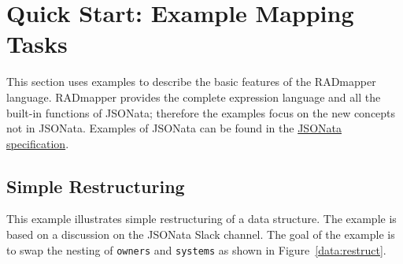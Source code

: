 \documentclass[9pt,letterpaper]{article}
\newcommand{\stt}[1]{\texttt{#1}}
\begin{document}

\section{Quick Start: Example Mapping Tasks}

This section uses examples to describe the basic features of the RADmapper language.
RADmapper provides the complete expression language and all the built-in functions of JSONata; therefore the examples focus on the new concepts not in JSONata.
Examples of JSONata can be found in the \href{https://jsonata.org/}{JSONata specification}.

\subsection{Simple Restructuring}

This example illustrates simple restructuring of a data structure.
The example is based on a discussion on the JSONata Slack channel.
The goal of the example is to swap the nesting of \stt{owners} and \stt{systems} as shown in Figure~\ref{data:restruct}.
\end{document}
